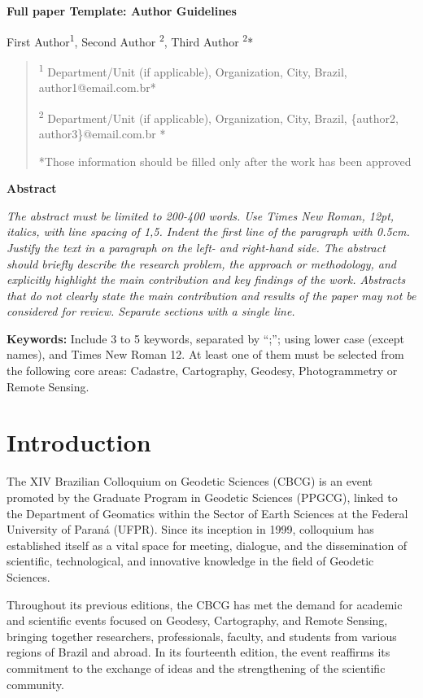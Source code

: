 \documentclass[12pt,a4paper]{article}
\begin{document}
\textbf{Full paper Template: Author Guidelines}

First Author\textsuperscript{1}, Second Author \textsuperscript{2},
Third Author \textsuperscript{2}*

\begin{quote}
\textsuperscript{1} Department/Unit (if applicable), Organization, City,
Brazil, author1@email.com.br*

\textsuperscript{2} Department/Unit (if applicable), Organization, City,
Brazil, \{author2, author3\}@email.com.br *

*Those information should be filled only after the work has been
approved
\end{quote}

\textbf{Abstract}

\emph{The abstract must be limited to 200-400 words. Use Times New
Roman, 12pt, italics, with line spacing of 1,5. Indent the first line of
the paragraph with 0.5cm. Justify the text in a paragraph on the left-
and right-hand side. The abstract should briefly describe the research
problem, the approach or methodology, and explicitly highlight the main
contribution and key findings of the work. Abstracts that do not clearly
state the main contribution and results of the paper may not be
considered for review. Separate sections with a single line.}

\textbf{Keywords:} Include 3 to 5 keywords, separated by ``;''; using
lower case (except names), and Times New Roman 12. At least one of them
must be selected from the following core areas: Cadastre, Cartography,
Geodesy, Photogrammetry or Remote Sensing.

\section{Introduction}

The XIV Brazilian Colloquium on Geodetic Sciences (CBCG) is an event
promoted by the Graduate Program in Geodetic Sciences (PPGCG), linked to
the Department of Geomatics within the Sector of Earth Sciences at the
Federal University of Paraná (UFPR). Since its inception in 1999,
colloquium has established itself as a vital space for meeting,
dialogue, and the dissemination of scientific, technological, and
innovative knowledge in the field of Geodetic Sciences.

Throughout its previous editions, the CBCG has met the demand for
academic and scientific events focused on Geodesy, Cartography, and
Remote Sensing, bringing together researchers, professionals, faculty,
and students from various regions of Brazil and abroad. In its
fourteenth edition, the event reaffirms its commitment to the exchange
of ideas and the strengthening of the scientific community.
\end{document}
